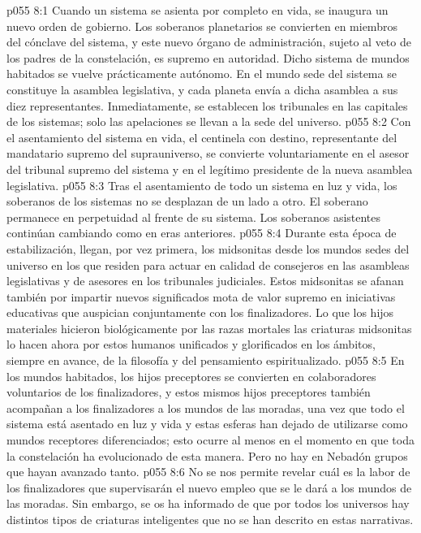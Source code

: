 \vs p055 8:1 Cuando un sistema se asienta por completo en vida, se inaugura un nuevo orden de gobierno. Los soberanos planetarios se convierten en miembros del cónclave del sistema, y este nuevo órgano de administración, sujeto al veto de los padres de la constelación, es supremo en autoridad. Dicho sistema de mundos habitados se vuelve prácticamente autónomo. En el mundo sede del sistema se constituye la asamblea legislativa, y cada planeta envía a dicha asamblea a sus diez representantes. Inmediatamente, se establecen los tribunales en las capitales de los sistemas; solo las apelaciones se llevan a la sede del universo.
\vs p055 8:2 Con el asentamiento del sistema en vida, el centinela con destino, representante del mandatario supremo del suprauniverso, se convierte voluntariamente en el asesor del tribunal supremo del sistema y en el legítimo presidente de la nueva asamblea legislativa.
\vs p055 8:3 Tras el asentamiento de todo un sistema en luz y vida, los soberanos de los sistemas no se desplazan de un lado a otro. El soberano permanece en perpetuidad al frente de su sistema. Los soberanos asistentes continúan cambiando como en eras anteriores.
\vs p055 8:4 Durante esta época de estabilización, llegan, por vez primera, los midsonitas desde los mundos sedes del universo en los que residen para actuar en calidad de consejeros en las asambleas legislativas y de asesores en los tribunales judiciales. Estos midsonitas se afanan también por impartir nuevos significados mota de valor supremo en iniciativas educativas que auspician conjuntamente con los finalizadores. Lo que los hijos materiales hicieron biológicamente por las razas mortales las criaturas midsonitas lo hacen ahora por estos humanos unificados y glorificados en los ámbitos, siempre en avance, de la filosofía y del pensamiento espiritualizado.
\vs p055 8:5 \pc En los mundos habitados, los hijos preceptores se convierten en colaboradores voluntarios de los finalizadores, y estos mismos hijos preceptores también acompañan a los finalizadores a los mundos de las moradas, una vez que todo el sistema está asentado en luz y vida y estas esferas han dejado de utilizarse como mundos receptores diferenciados; esto ocurre al menos en el momento en que toda la constelación ha evolucionado de esta manera. Pero no hay en Nebadón grupos que hayan avanzado tanto.
\vs p055 8:6 No se nos permite revelar cuál es la labor de los finalizadores que supervisarán el nuevo empleo que se le dará a los mundos de las moradas. Sin embargo, se os ha informado de que por todos los universos hay distintos tipos de criaturas inteligentes que no se han descrito en estas narrativas.
